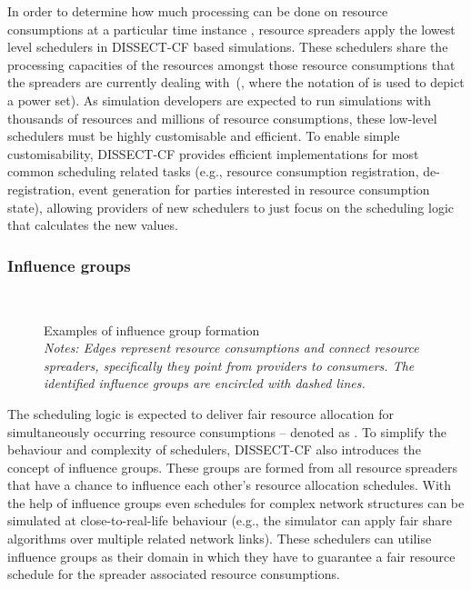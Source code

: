 \documentclass[sort, compress, 5p]{elsarticle}
\begin{document}
In order to determine how much processing can be done on resource consumptions at a particular time instance , resource spreaders apply the lowest level schedulers in DISSECT-CF based simulations. These schedulers share the processing capacities of the resources amongst those resource consumptions that the spreaders are currently dealing with~(, where the notation of  is used to depict a power set). As simulation developers are expected to run simulations with thousands of resources and millions of resource consumptions, these low-level schedulers must be highly customisable and efficient. To enable simple customisability, DISSECT-CF provides efficient implementations for most common scheduling related tasks (e.g., resource consumption registration, de-registration, event generation for parties interested in resource consumption state), allowing providers of new schedulers to just focus on the scheduling logic that calculates the new  values.

\subsubsection{Influence groups}
\begin{figure}[tb]
\centering
{}\\
\caption{Examples of influence group formation\\
\emph{\footnotesize Notes: Edges represent resource consumptions and connect resource spreaders, specifically they point from providers to consumers. The identified influence groups are encircled with dashed lines. }\label{FIG-INFLUENCE}}
\end{figure}

The scheduling logic is expected to deliver fair resource allocation for simultaneously occurring resource consumptions -- denoted as . To simplify the behaviour and complexity of schedulers, DISSECT-CF also introduces the concept of influence groups. These groups are formed from all resource spreaders that have a chance to influence each other's resource allocation schedules. With the help of influence groups even schedules for complex network structures can be simulated at close-to-real-life behaviour (e.g., the simulator can apply fair share algorithms over multiple related network links). These schedulers can utilise influence groups as their domain in which they have to guarantee a fair resource schedule for the spreader associated resource consumptions.
\end{document}
